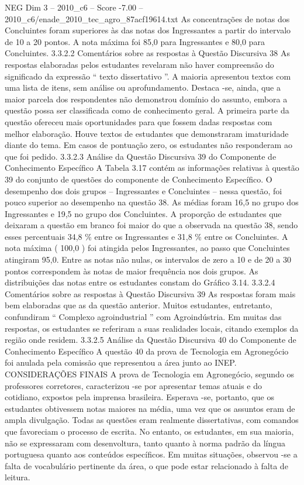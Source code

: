 \begin{textsample}{NEG Dim 3 – 2010\_c6 – Score -7.00 – 2010\_c6/enade\_2010\_tec\_agro\_87acf19614.txt}
As concentrações de notas dos Concluintes foram superiores às das notas dos Ingressantes a partir do intervalo de 10 a 20 pontos.
A nota máxima foi 85,0 para Ingressantes e 80,0 para Concluintes. 3.3.2.2 Comentários sobre as respostas à Questão Discursiva 38 As respostas elaboradas pelos estudantes revelaram não haver compreensão do significado da expressão “ texto dissertativo ”.
A maioria apresentou textos com uma lista de itens, sem análise ou aprofundamento.
Destaca -se, ainda, que a maior parcela dos respondentes não demonstrou domínio do assunto, embora a questão possa ser classificada como de conhecimento geral.
A primeira parte da questão ofereceu mais oportunidades para que fossem dadas respostas com melhor elaboração.
Houve textos de estudantes que demonstraram imaturidade diante do tema.
Em casos de pontuação zero, os estudantes não responderam ao que foi pedido. 3.3.2.3 Análise da Questão Discursiva 39 do Componente de Conhecimento Específico A Tabela 3.17 contém as informações relativas à questão 39 do conjunto de questões do componente de Conhecimento Específico.
O desempenho dos dois grupos – Ingressantes e Concluintes – nessa questão, foi pouco superior ao desempenho na questão 38.
As médias foram 16,5 no grupo dos Ingressantes e 19,5 no grupo dos Concluintes.
A proporção de estudantes que deixaram a questão em branco foi maior do que a observada na questão 38, sendo esses percentuais 34,8 \% entre os Ingressantes e 31,8 \% entre os Concluintes.
A nota máxima ( 100,0 ) foi atingida pelos Ingressantes, ao passo que Concluintes atingiram 95,0.
Entre as notas não nulas, os intervalos de zero a 10 e de 20 a 30 pontos correspondem às notas de maior frequência nos dois grupos.
As distribuições das notas entre os estudantes constam do Gráfico 3.14. 3.3.2.4 Comentários sobre as respostas à Questão Discursiva 39 As respostas foram mais bem elaboradas que as da questão anterior.
Muitos estudantes, entretanto, confundiram “ Complexo agroindustrial ” com Agroindústria.
Em muitas das respostas, os estudantes se referiram a suas realidades locais, citando exemplos da região onde residem. 3.3.2.5 Análise da Questão Discursiva 40 do Componente de Conhecimento Específico A questão 40 da prova de Tecnologia em Agronegócio foi anulada pela comissão que representou a área junto ao INEP.
CONSIDERAÇÕES FINAIS A prova de Tecnologia em Agronegócio, segundo os professores corretores, caracterizou -se por apresentar temas atuais e do cotidiano, expostos pela imprensa brasileira.
Esperava -se, portanto, que os estudantes obtivessem notas maiores na média, uma vez que os assuntos eram de ampla divulgação.
Todas as questões eram realmente dissertativas, com comandos que favoreciam o processo de escrita.
No entanto, os estudantes, em sua maioria, não se expressaram com desenvoltura, tanto quanto à norma padrão da língua portuguesa quanto aos conteúdos específicos.
Em muitas situações, observou -se a falta de vocabulário pertinente da área, o que pode estar relacionado à falta de leitura.

\end{textsample}
